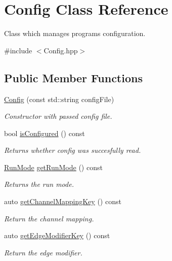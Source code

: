 \hypertarget{class_config}{}\section{Config Class Reference}
\label{class_config}


Class which manages programs configuration.  




{\ttfamily \#include $<$Config.\+hpp$>$}

\subsection*{Public Member Functions}
\begin{DoxyCompactItemize}
\item 
\hyperlink{class_config_af8b0e9dc72b16b73ebb32d177fb93e1b}{Config} (const std\+::string config\+File)
\begin{DoxyCompactList}\small\item\em Constructor with passed config file. \end{DoxyCompactList}\item 
bool \hyperlink{class_config_a47870f3f5bc52f5d0aa387c25e431055}{is\+Configured} () const
\begin{DoxyCompactList}\small\item\em Returns whether config was succesfully read. \end{DoxyCompactList}\item 
\hyperlink{_modes_enum_8hpp_a3dfe11cf1a3a8121f6cd7fec4bf5947e}{Run\+Mode} \hyperlink{class_config_abae125b9691d912dcf6ca0351844f0b1}{get\+Run\+Mode} () const
\begin{DoxyCompactList}\small\item\em Returns the run mode. \end{DoxyCompactList}\item 
auto \hyperlink{class_config_a29f6393b81473d6590f5cd6f6e927693}{get\+Channel\+Mapping\+Key} () const
\begin{DoxyCompactList}\small\item\em Return the channel mapping. \end{DoxyCompactList}\item 
auto \hyperlink{class_config_a6e86864ba8e73310866654a53bd46170}{get\+Edge\+Modifier\+Key} () const
\begin{DoxyCompactList}\small\item\em Return the edge modifier. \end{DoxyCompactList}\item 

\end{DoxyCompactItemize}
